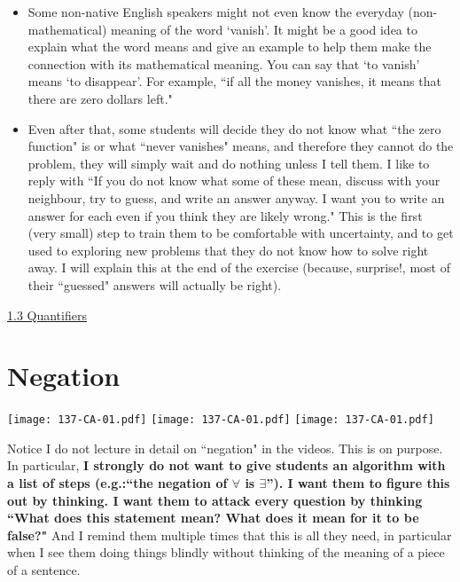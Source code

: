 \documentclass[11pt]{article}
\newcommand{\n}{\newpage}
\newcommand{\nl}{\hfill \vspace{-1.1\baselineskip}} %
\newcommand{\vthree}{\hspace{8mm}\href{https://www.youtube.com/watch?v=XHapWWI_wJ8&list=PLlwePzQY_wW-CPzhk-af-MXj9knthD1gx&index=3}{1.3 Quantifiers}}
\begin{document}
\begin{comments}
\nl
	\begin{itemize} 
		\item Some non-native English speakers might not even know the everyday (non-mathematical) meaning of the word `vanish'. It might be a good idea to explain what the word means and give an example to help them make the connection with its mathematical meaning. You can say that `to vanish' means  `to disappear'. For example, ``if all the money vanishes, it means that there are zero dollars left." 
		\item  Even after that, some students will decide they do not know what ``the zero function" is or what ``never vanishes" means, and therefore they cannot do the problem, they will simply wait and do nothing unless I tell them.  I like to reply with ``If you do not know what some of these mean, discuss with your neighbour, try to guess, and write an answer anyway. I want you to write an answer for each even if you think they are likely wrong."  This is the first (very small) step to train them to be comfortable with uncertainty, and to get used to exploring new problems that they do not know how to solve right away.   I will explain this at the end of the exercise (because, surprise!, most of their ``guessed" answers will actually be right).		
	\end{itemize}
\end{comments}

\begin{videos}
\vthree

\end{videos}

\n
\newpage
\section{Negation} 

\begin{center}
{ \texttt{[image: 137-CA-01.pdf]}} \quad
{ \texttt{[image: 137-CA-01.pdf]}}
{ \texttt{[image: 137-CA-01.pdf]}}
\end{center}

\vspace{-1.5cm}

\begin{warning}
Notice I do not  lecture in detail on ``negation" in the videos. This is on purpose. In particular, \textbf{I strongly do not want to give students an algorithm with a list of steps (e.g.:``the negation of $\forall$ is $\exists$'').  I want them to figure this out by thinking. I want them to attack every question by thinking ``What does this statement mean?  What does it mean for it to be false?" } And I remind them multiple times that this is all they need, in particular when I see them doing things blindly without thinking of the meaning of a piece of a sentence.  
\end{warning}
\end{document}

